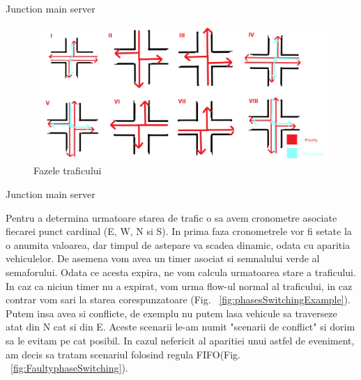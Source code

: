 \documentclass{beamer}
\begin{document}
    \begin{frame}{Junction main server}
        \begin{figure}[h!]
            \includegraphics[width=\textwidth]{Sketches/AvailableJunctionphases.png}
            \caption{Fazele traficului}
            \label{fig:Junction_phases}
        \end{figure}

    \end{frame}

    \begin{frame}{Junction main server}

        Pentru a determina urmatoare starea de trafic o sa avem cronometre asociate 
        fiecarei punct cardinal (E, W, N si S). In prima faza cronometrele vor fi 
        setate la o anumita valoarea, dar timpul de astepare va scadea dinamic, 
        odata cu aparitia vehiculelor. De asemena vom avea un timer asociat si 
        semnalului verde al semaforului. Odata ce acesta expira, ne vom calcula 
        urmatoarea stare a traficului. In caz ca niciun timer nu a expirat, vom 
        urma flow-ul normal al traficului, in caz contrar vom sari la starea corespunzatoare
        (Fig. ~\ref{fig:phasesSwitchingExample}). Putem insa avea si conflicte, de 
        exemplu nu putem lasa vehicule sa traverseze atat din N cat si din E. 
        Aceste scenarii le-am numit "scenarii de conflict" si dorim sa le 
        evitam pe cat posibil. In cazul nefericit al aparitiei unui astfel de 
        eveniment, am decis sa tratam scenariul folosind regula FIFO(Fig. ~\ref{fig:FaultyphaseSwitching}).
    
    \end{frame}
\end{document}
